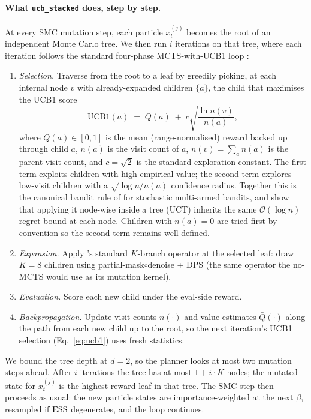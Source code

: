\paragraph{What \texttt{ucb\_stacked} does, step by step.}
At every SMC mutation step, each particle $x_t^{(j)}$ becomes the root of an independent Monte Carlo tree. We then run $i$ iterations on that tree, where each iteration follows the standard four-phase MCTS-with-UCB1 loop \citep[``UCT'';][]{kocsis2006uct}:
\begin{enumerate}
\item \emph{Selection.} Traverse from the root to a leaf by greedily picking, at each internal node $v$ with already-expanded children $\{a\}$, the child that maximises the UCB1 score \citep{auer2002ucb,kocsis2006uct}
\begin{equation}\label{eq:ucb1}
    \mathrm{UCB1}(a) \;=\; \bar{Q}(a) \;+\; c\sqrt{\frac{\ln n(v)}{n(a)}},
\end{equation}
where $\bar{Q}(a)\!\in\![0,1]$ is the mean (range-normalised) reward backed up through child $a$, $n(a)$ is the visit count of $a$, $n(v)\!=\!\sum_a n(a)$ is the parent visit count, and $c\!=\!\sqrt{2}$ is the standard exploration constant. The first term exploits children with high empirical value; the second term explores low-visit children with a $\sqrt{\log n / n(a)}$ confidence radius. Together this is the canonical bandit rule of \citet{auer2002ucb} for stochastic multi-armed bandits, and \citet{kocsis2006uct} show that applying it node-wise inside a tree (UCT) inherits the same $\mathcal{O}(\log n)$ regret bound at each node. Children with $n(a)\!=\!0$ are tried first by convention so the second term remains well-defined.
\item \emph{Expansion.} Apply \gpa{}'s standard $K$-branch operator at the selected leaf: draw $K\!=\!8$ children using partial-mask$\circ$denoise + DPS (the same operator the no-MCTS \gpa{} would use as its mutation kernel).
\item \emph{Evaluation.} Score each new child under the eval-side reward.
\item \emph{Backpropagation.} Update visit counts $n(\cdot)$ and value estimates $\bar{Q}(\cdot)$ along the path from each new child up to the root, so the next iteration's UCB1 selection (Eq.~\ref{eq:ucb1}) uses fresh statistics.
\end{enumerate}
We bound the tree depth at $d\!=\!2$, so the planner looks at most two mutation steps ahead. After $i$ iterations the tree has at most $1\!+\!i\!\cdot\!K$ nodes; the mutated state for $x_t^{(j)}$ is the highest-reward leaf in that tree. The SMC step then proceeds as usual: the new particle states are importance-weighted at the next $\beta$, resampled if $\operatorname{ESS}$ degenerates, and the loop continues.


